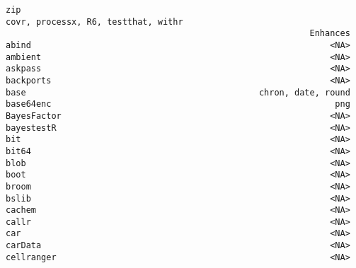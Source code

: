 \documentclass[
  letterpaper,
  DIV=11,
  numbers=noendperiod]{scrreprt}
\begin{document}
\begin{verbatim}
zip                                                                                                                                                                                                                                                                                                                                                                                                                                                                                                                                                                                                                                                                                                                                                                                                                                                                                                                                                                                                                                                                                                                                                                                                                                                                       covr, processx, R6, testthat, withr
                                                            Enhances
abind                                                           <NA>
ambient                                                         <NA>
askpass                                                         <NA>
backports                                                       <NA>
base                                              chron, date, round
base64enc                                                        png
BayesFactor                                                     <NA>
bayestestR                                                      <NA>
bit                                                             <NA>
bit64                                                           <NA>
blob                                                            <NA>
boot                                                            <NA>
broom                                                           <NA>
bslib                                                           <NA>
cachem                                                          <NA>
callr                                                           <NA>
car                                                             <NA>
carData                                                         <NA>
cellranger                                                      <NA>

\end{verbatim}
\end{document}
